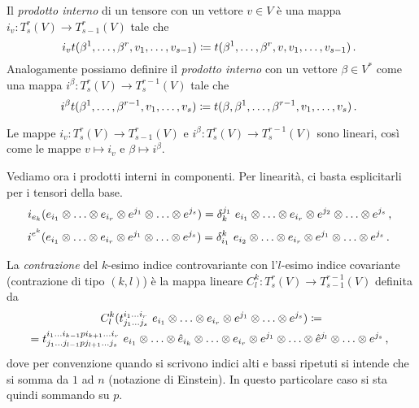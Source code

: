 \begin{definition}  \label{def:ProdottoInternoTensore}
	Il \emph{prodotto interno} di un tensore con un vettore $v\in V$  è una mappa $i_v:T_s^r(V)\to T_{s-1}^r(V)$ tale che
	\begin{equation*}
		i_vt(\beta^1,\ldots,\beta^r,v_1,\ldots,v_{s-1}) \coloneqq t(\beta^1,\ldots,\beta^r,v,v_1,\ldots,v_{s-1})\, \text{. }
	\end{equation*}
	Analogamente possiamo definire il \emph{prodotto interno} con un vettore $\beta \in V^*$ come una mappa $i^\beta:T_s^r(V)\to T_{s}^{r-1}(V)$ tale che
	\begin{equation*}
		i^\beta t(\beta^1,\ldots,\beta^{r-1},v_1,\ldots,v_s) \coloneqq t(\beta,\beta^1,\ldots,\beta^{r-1},v_1,\ldots,v_s)\, \text{. }
	\end{equation*}
\end{definition}

\begin{remark}
	Le mappe $i_v:T_s^r(V)\to T_{s-1}^r(V)$ e $i^\beta:T_s^r(V)\to T_s^{r-1}(V)$ sono lineari, così come le mappe $v\mapsto i_v$ e $\beta\mapsto i^\beta$.
\end{remark}

Vediamo ora i prodotti interni in componenti. Per linearità, ci basta esplicitarli per i tensori della base.
\begin{equation*}
	i_{e_k} (e_{i_1}\otimes \ldots \otimes e_{i_r}\otimes e^{j_1}\otimes \ldots\otimes e^{j_s}) = \delta_k^{j_1}\ e_{i_1}\otimes \ldots \otimes e_{i_r}\otimes e^{j_2}\otimes \ldots\otimes e^{j_s}\virgola
\end{equation*}
\begin{equation*}
	i^{e^k} (e_{i_1}\otimes \ldots \otimes e_{i_r}\otimes e^{j_1}\otimes \ldots\otimes e^{j_s}) = \delta_{i_1}^k\ e_{i_2}\otimes \ldots \otimes e_{i_r}\otimes e^{j_1}\otimes \ldots\otimes e^{j_s}\punto
\end{equation*}

\begin{definition} 
	La \emph{contrazione} del $k$-esimo indice controvariante con l'$l$-esimo indice covariante (contrazione di tipo $(k,l)$) è la mappa lineare $C_l^k:T_s^r(V)\to T_{s-1}^{r-1}(V)$ definita da 
	\begin{multline*}
		C_l^k(t_{j_1\ldots j_s}^{i_1\ldots i_r}\ e_{i_1}\otimes \ldots \otimes e_{i_r}\otimes e^{j_1}\otimes \ldots\otimes e^{j_s}) \coloneqq\\
		=t_{j_1\ldots j_{l-1}pj_{l+1}\ldots j_s}^{i_1\ldots i_{k-1}pi_{k+1}\ldots i_r}\ e_{i_1}\otimes \ldots \otimes\hat e_{i_k}\otimes \ldots\otimes e_{i_r}\otimes e^{j_1}\otimes \ldots\otimes \hat e^{j_l}\otimes \ldots \otimes e^{j_s} \, \text{, }
	\end{multline*}
	dove per convenzione quando si scrivono indici alti e bassi ripetuti si intende che si somma da $1$ ad $n$ (notazione di Einstein). In questo particolare caso si sta quindi sommando su $p$.
\end{definition}

